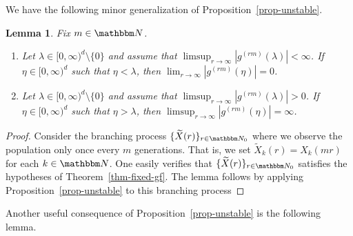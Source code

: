 \documentclass[11pt]{article}
\theoremstyle{plain}
\newtheorem{lem}[thm]{Lemma}
\theoremstyle{definition}
\numberwithin{equation}{section}
\newcommand{\BB}{\mathbbm}
\newcommand{\wt}{\widetilde}
\begin{document}
We have the following minor generalization of Proposition~\ref{prop-unstable}. 

\begin{lem} \label{lem-unstable-ssl}
Fix $m\in\BB N$. 
\begin{enumerate}[$(i)$]
\item Let $\lambda \in [0,\infty)^d \setminus \{0\}$ and assume that $\limsup_{r \to\infty} | g^{(r m )}(\lambda)| < \infty$. 
If $\eta \in [0,\infty)^d$ such that $\eta < \lambda$, then $\lim_{r \to\infty} |g^{(r m)}(\eta)| = 0$.  \label{item-unstable-zero-ssl}
\item Let $\lambda \in [0,\infty)^d \setminus \{0\}$ and assume that $\limsup_{r \to\infty} | g^{(r m)}(\lambda)| > 0 $. 
If $\eta \in [0,\infty)^d$ such that $\eta > \lambda$, then $\limsup_{r \to\infty} |g^{(r m)}(\eta)| = \infty$. \label{item-unstable-infty-ssl} 
\end{enumerate}
\end{lem}
\begin{proof}
Consider the branching process $\{\wt X(r)\}_{r\in\BB N_0}$ where we observe the population only once every $m$ generations. That is, we set $\wt X_k(r) = X_k(m r)$ for each $k \in \BB N$. One easily verifies that $\{\wt X(r)\}_{r\in\BB N_0}$ satisfies the hypotheses of Theorem~\ref{thm-fixed-gf}. The lemma follows by applying Proposition~\ref{prop-unstable} to this branching process
\end{proof}


Another useful consequence of Proposition~\ref{prop-unstable} is the following lemma. 
\end{document}
